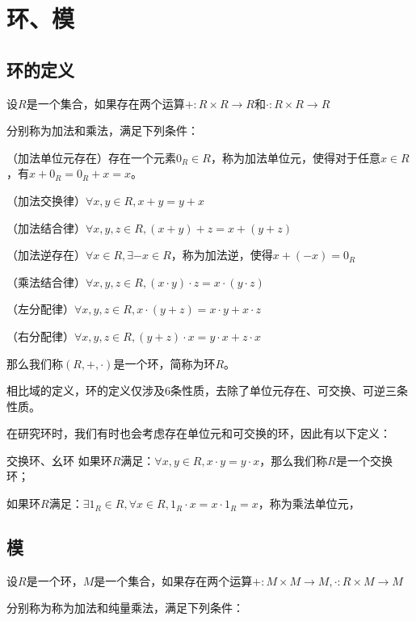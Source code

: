 \documentclass[12pt, a4paper, oneside, UTF8]{ctexbook}
\begin{document}
% 
\else
\fi
\chapter{环、模}
	\section{环的定义}
		\begin{defn}{}
			设$R$是一个集合，如果存在两个运算$+ : R \times R \rightarrow R$和$\cdot : R \times R \rightarrow R$

			分别称为加法和乘法，满足下列条件：

			 （加法单位元存在）存在一个元素$0_R \in R$，称为加法单位元，使得对于任意$x \in R$，有$x + 0_R = 0_R + x = x$。

			 （加法交换律）$\forall x, y \in R,x + y = y + x$

			 （加法结合律）$\forall x, y, z \in R,(x + y) + z = x + (y + z)$

			 （加法逆存在）$\forall x \in R,\exists -x \in R$，称为加法逆，使得$x + (-x) = 0_R$

			 （乘法结合律）$\forall x, y, z \in R,(x \cdot y) \cdot z = x \cdot (y \cdot z)$

			 （左分配律）$\forall x, y, z \in R,x \cdot (y + z) = x \cdot y + x \cdot z$
						
						（右分配律）$\forall x, y, z \in R,(y + z) \cdot x = y \cdot x + z \cdot x$

			那么我们称$(R,+,\cdot)$是一个环，简称为环$R$。
		\end{defn}
		相比域的定义，环的定义仅涉及6条性质，去除了单位元存在、可交换、可逆三条性质。

		在研究环时，我们有时也会考虑存在单位元和可交换的环，因此有以下定义：
		\begin{defn}{交换环、幺环}{}
			如果环$R$满足：$\forall x,y \in R,x \cdot y = y \cdot x$，那么我们称$R$是一个交换环；

			如果环$R$满足：$\exists 1_R \in R,\forall x \in R,1_R \cdot x = x \cdot 1_R = x$，称为乘法单位元，
		\end{defn}
	\section{模}
		\begin{defn}
			设$R$是一个环，$M$是一个集合，如果存在两个运算$+ : M \times M \rightarrow M,\cdot : R \times M \rightarrow M$
			
			分别称为称为加法和纯量乘法，满足下列条件：

			\ding{172} 
		\end{defn}
\ifx\allfiles\undefined
\end{document}
